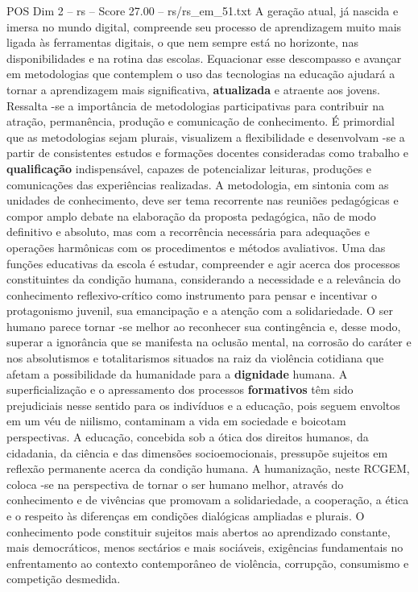\begin{textsample}{POS Dim 2 – rs – Score 27.00 – rs/rs\_em\_51.txt}
A geração atual, já nascida e imersa no mundo digital, compreende seu processo de aprendizagem muito mais ligada às ferramentas digitais, o que nem sempre está no horizonte, nas disponibilidades e na rotina das escolas.
Equacionar esse descompasso e avançar em metodologias que contemplem o uso das tecnologias na educação ajudará a tornar a aprendizagem mais significativa, \textbf{atualizada} e atraente aos jovens.
Ressalta -se a importância de metodologias participativas para contribuir na atração, permanência, produção e comunicação de conhecimento.
É primordial que as metodologias sejam plurais, visualizem a flexibilidade e desenvolvam -se a partir de consistentes estudos e formações docentes consideradas como trabalho e \textbf{qualificação} indispensável, capazes de potencializar leituras, produções e comunicações das experiências realizadas.
A metodologia, em sintonia com as unidades de conhecimento, deve ser tema recorrente nas reuniões pedagógicas e compor amplo debate na elaboração da proposta pedagógica, não de modo definitivo e absoluto, mas com a recorrência necessária para adequações e operações harmônicas com os procedimentos e métodos avaliativos.
Uma das funções educativas da escola é estudar, compreender e agir acerca dos processos constituintes da condição humana, considerando a necessidade e a relevância do conhecimento reflexivo-crítico como instrumento para pensar e incentivar o protagonismo juvenil, sua emancipação e a atenção com a solidariedade.
O ser humano parece tornar -se melhor ao reconhecer sua contingência e, desse modo, superar a ignorância que se manifesta na oclusão mental, na corrosão do caráter e nos absolutismos e totalitarismos situados na raiz da violência cotidiana que afetam a possibilidade da humanidade para a \textbf{dignidade} humana.
A superficialização e o apressamento dos processos \textbf{formativos} têm sido prejudiciais nesse sentido para os indivíduos e a educação, pois seguem envoltos em um véu de niilismo, contaminam a vida em sociedade e boicotam perspectivas.
A educação, concebida sob a ótica dos direitos humanos, da cidadania, da ciência e das dimensões socioemocionais, pressupõe sujeitos em reflexão permanente acerca da condição humana.
A humanização, neste RCGEM, coloca -se na perspectiva de tornar o ser humano melhor, através do conhecimento e de vivências que promovam a solidariedade, a cooperação, a ética e o respeito às diferenças em condições dialógicas ampliadas e plurais.
O conhecimento pode constituir sujeitos mais abertos ao aprendizado constante, mais democráticos, menos sectários e mais sociáveis, exigências fundamentais no enfrentamento ao contexto contemporâneo de violência, corrupção, consumismo e competição desmedida.

\end{textsample}
